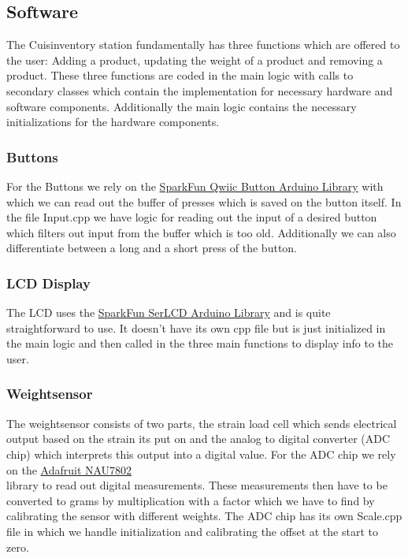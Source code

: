 \documentclass{article}
\begin{document}
\subsection{Software}
The Cuisinventory station fundamentally has three functions which are offered to the user: Adding a product, updating the weight of a product and removing a product.
These three functions are coded in the main logic with calls to secondary classes which contain the implementation for necessary hardware and software components.
Additionally the main logic contains the necessary initializations for the hardware components. 
\subsubsection{Buttons}
For the Buttons we rely on the \href{https://github.com/sparkfun/SparkFun_Qwiic_Button_Arduino_Library}{SparkFun Qwiic Button Arduino Library} with which we can read out the buffer of presses which is saved on the button itself.
In the file Input.cpp we have logic for reading out the input of a desired button which filters out input from the buffer which is too old.
Additionally we can also differentiate between a long and a short press of the button.
\subsubsection{LCD Display}
The LCD uses the \href{https://github.com/sparkfun/SparkFun_SerLCD_Arduino_Library}{SparkFun SerLCD Arduino Library} and is quite straightforward to use. It doesn't have its own cpp file but is just initialized in the main logic
and then called in the three main functions to display info to the user.
\subsubsection{Weightsensor}
The weightsensor consists of two parts, the strain load cell which sends electrical output based on the strain its put on and the analog to digital converter (ADC chip) which interprets this output into a digital value.
For the ADC chip we rely on the \href{https://github.com/adafruit/Adafruit_NAU7802}{Adafruit NAU7802}\\ library to read out digital measurements.
These measurements then have to be converted to grams by multiplication with a factor which we have to find by calibrating the sensor with different weights.
The ADC chip has its own Scale.cpp file in which we handle initialization and calibrating the offset at the start to zero.
\end{document}
